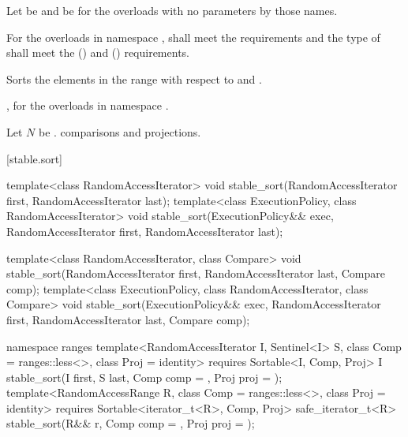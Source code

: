 \begin{itemdescr}
\pnum
Let  be 
and  be 
for the overloads with no parameters by those names.

\pnum
\requires
For the overloads in namespace ,
 shall meet
the  requirements and
the type of  shall meet
the  () and
 () requirements.

\pnum
\effects
Sorts the elements in the range 
with respect to  and .

\pnum
\returns
{}, for the overloads in namespace .

\pnum
\complexity
Let $N$ be .
 comparisons and projections.
\end{itemdescr}

[stable.sort]{}

%
\begin{itemdecl}
template<class RandomAccessIterator>
  void stable_sort(RandomAccessIterator first, RandomAccessIterator last);
template<class ExecutionPolicy, class RandomAccessIterator>
  void stable_sort(ExecutionPolicy&& exec,
                   RandomAccessIterator first, RandomAccessIterator last);

template<class RandomAccessIterator, class Compare>
  void stable_sort(RandomAccessIterator first, RandomAccessIterator last,
                   Compare comp);
template<class ExecutionPolicy, class RandomAccessIterator, class Compare>
  void stable_sort(ExecutionPolicy&& exec,
                   RandomAccessIterator first, RandomAccessIterator last,
                   Compare comp);

namespace ranges {
  template<RandomAccessIterator I, Sentinel<I> S, class Comp = ranges::less<>,
           class Proj = identity>
    requires Sortable<I, Comp, Proj>
    I stable_sort(I first, S last, Comp comp = {}, Proj proj = {});
  template<RandomAccessRange R, class Comp = ranges::less<>, class Proj = identity>
    requires Sortable<iterator_t<R>, Comp, Proj>
    safe_iterator_t<R>
      stable_sort(R&& r, Comp comp = {}, Proj proj = {});
}
\end{itemdecl}

